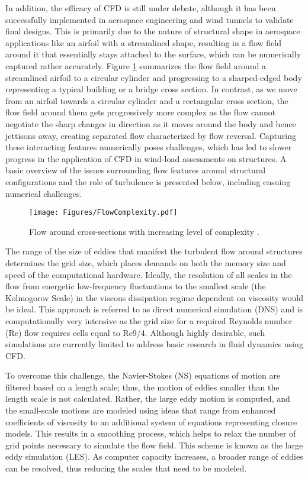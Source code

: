 In addition, the efficacy of CFD is still under debate, although it has been successfully implemented in aerospace engineering and wind tunnels to validate final designs. This is primarily due to the nature of structural shape in aerospace applications like an airfoil with a streamlined shape, resulting in a flow field around it that essentially stays attached to the surface, which can be numerically captured rather accurately.
Figure \ref{fig:cfdWind_FlowComplexity} summarizes the flow field around a streamlined airfoil to a circular cylinder and progressing to a sharped-edged body representing a typical building or a bridge cross section. In contrast, as we move from an airfoil towards a circular cylinder and a rectangular cross section, the flow field around them gets progressively more complex as the flow cannot negotiate the sharp changes in direction as it moves around the body and hence jettisons away, creating separated flow characterized by flow reversal. Capturing these interacting features numerically poses challenges, which has led to slower progress in the application of CFD in wind-load assessments on structures. A basic overview of the issues surrounding flow features around structural configurations and the role of turbulence is presented below, including ensuing numerical challenges.

\begin{figure}[htb]
    \centering
    \texttt{[image: Figures/FlowComplexity.pdf]}
    \caption{Flow around cross-sections with increasing level of complexity \citep{ding2018aerodynamic}.}
    \label{fig:cfdWind_FlowComplexity}
\end{figure}

The range of the size of eddies that manifest the turbulent flow around structures determines the grid size, which places demands on both the memory size and speed of the computational hardware. Ideally, the resolution of all scales in the flow from energetic low-frequency fluctuations to the smallest scale (the Kolmogorov Scale) in the viscous dissipation regime dependent on viscosity would be ideal. This approach is referred to as direct numerical simulation (DNS) and is computationally very intensive as the grid size for a required Reynolds number (Re) flow requires cells equal to Re9/4. Although highly desirable, such simulations are currently limited to address basic research in fluid dynamics using CFD. 

To overcome this challenge, the Navier-Stokes (NS) equations of motion are filtered based on a length scale; thus, the motion of eddies smaller than the length scale is not calculated. Rather, the large eddy motion is computed, and the small-scale motions are modeled using ideas that range from enhanced coefficients of viscosity to an additional system of equations representing closure models. This results in a smoothing process, which helps to relax the number of grid points necessary to simulate the flow field. This scheme is known as the large eddy simulation (LES). As computer capacity increases, a broader range of eddies can be resolved, thus reducing the scales that need to be modeled. 

